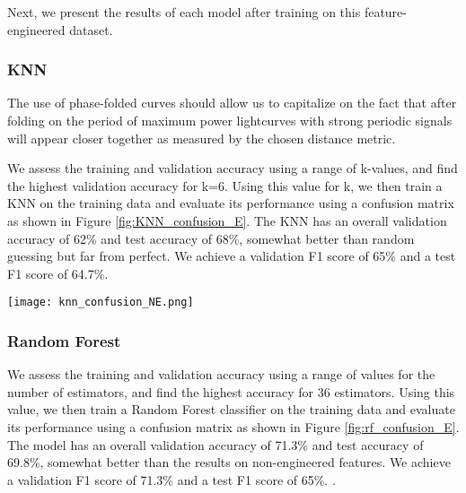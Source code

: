 \documentclass{article}
\begin{document}
Next, we present the results of each model after training on this feature-engineered dataset.




\subsubsection{KNN}
The use of phase-folded curves should allow us to capitalize on the fact that after folding on the period of maximum power lightcurves with strong periodic signals will appear closer together as measured by the chosen distance metric. 

We assess the training and validation accuracy using a range of k-values, and find the
highest validation accuracy for k=6. Using this value for k, we then train a KNN on the training data and
evaluate its performance using a confusion matrix as shown in Figure \ref{fig:KNN_confusion_E}. The KNN has an overall validation
accuracy of 62\% and test accuracy of 68\%, somewhat better than random guessing but far from perfect. We achieve a validation F1 score of 65\% and a test F1 score of 64.7\%. 

\begin{figure*}[ht]
\centering
\texttt{[image: knn\_confusion\_NE.png]}
\caption{A confusion matrix for our KNN classifier trained using k=6 on engineered data.}
\label{fig:KNN_confusion_E}
\end{figure*}


\subsubsection{Random Forest}

We assess the training and validation accuracy using a range of values for the number of estimators, and find the highest accuracy for 36 estimators. Using this value, we then train a Random Forest classifier on the training data and
evaluate its performance using a confusion matrix as shown in Figure \ref{fig:rf_confusion_E}. The model has an overall validation
accuracy of 71.3\% and test accuracy of 69.8\%, somewhat better than the results on non-engineered features. We achieve a validation F1 score of 71.3\% and a test F1 score of 65\%. . 
\end{document}
